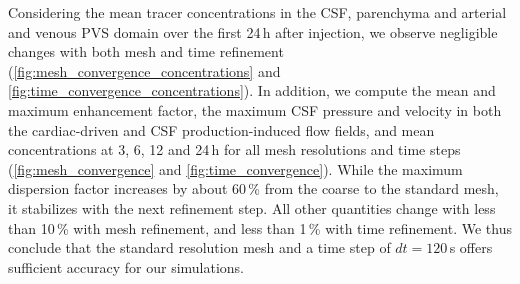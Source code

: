 \documentclass[fleqn,10pt]{wlscirep}
\begin{document}
Considering the mean tracer concentrations in the CSF, parenchyma and arterial and venous PVS domain over the first 24\,h after injection, we observe negligible changes with both mesh and time refinement (\cref{fig:mesh_convergence_concentrations} and 
\ref{fig:time_convergence_concentrations}). In addition, we compute the mean and maximum enhancement factor, the maximum CSF pressure and velocity in both the cardiac-driven and CSF production-induced flow fields, and mean concentrations at 3, 6, 12 and 24\,h for all mesh resolutions and time steps (\cref{fig:mesh_convergence} and \cref{fig:time_convergence}). While the maximum dispersion factor increases by about 60\,\% from the coarse to the standard mesh, it stabilizes with the next refinement step. All other quantities change with less than 10\,\% with mesh refinement, and less than 1\,\% with time refinement. We thus conclude that the standard resolution mesh and a time step of $dt=120\,$s offers sufficient accuracy for our simulations.
\end{document}

